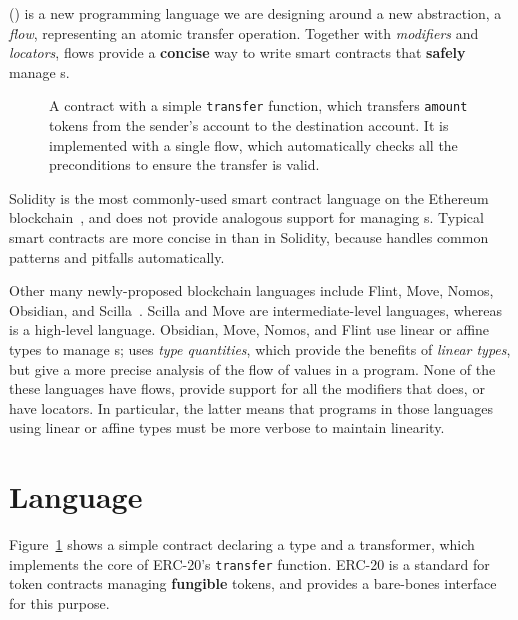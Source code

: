 \documentclass[dvipsnames,runningheads]{llncs}
\begin{document}
\langName (\langNamePronounce) is a new programming language we are designing around a new abstraction, a \emph{flow}, representing an atomic transfer operation.
Together with \emph{modifiers} and \emph{locators}, flows provide a \textbf{concise} way to write smart contracts that \textbf{safely} manage \assetTxt{}s.
\begin{figure}
    \vspace{-2em}
    \centering
    
    \vspace{-1em}
    \caption{A \langName contract with a simple \lstinline{transfer} function, which transfers \lstinline{amount} tokens from the sender's account to the destination account.
It is implemented with a single flow, which automatically checks all the preconditions to ensure the transfer is valid.}
    \label{fig:erc20-transfer-flow}
    \vspace{-1em}
\end{figure}

Solidity is the most commonly-used smart contract language on the Ethereum blockchain~\cite{EthereumForDevs}, and does not provide analogous support for managing \assetTxt{}s.
Typical smart contracts are more concise in \langName than in Solidity, because \langName handles common patterns and pitfalls automatically.

Other many newly-proposed blockchain languages include Flint, Move, Nomos, Obsidian, and Scilla~\cite{schrans2018flint,blackshear2019move,das2019nomos,coblenz2019obsidian,sergey2019scilla}.
Scilla and Move are intermediate-level languages, whereas \langName is a high-level language.
Obsidian, Move, Nomos, and Flint use linear or affine types to manage \assetTxt{}s; \langName uses \emph{type quantities}, which provide the benefits of \emph{linear types}, but give a more precise analysis of the flow of values in a program.
None of the these languages have flows, provide support for all the modifiers that \langName does, or have locators.
In particular, the latter means that programs in those languages using linear or affine types must be more verbose to maintain linearity.

\section{Language}\label{sec:lang}
Figure~\ref{fig:erc20-transfer-flow} shows a simple contract declaring a type and a transformer, which implements the core of ERC-20's \lstinline{transfer} function.
ERC-20 is a standard for token contracts managing \textbf{fungible} tokens, and provides a bare-bones interface for this purpose.
\end{document}
